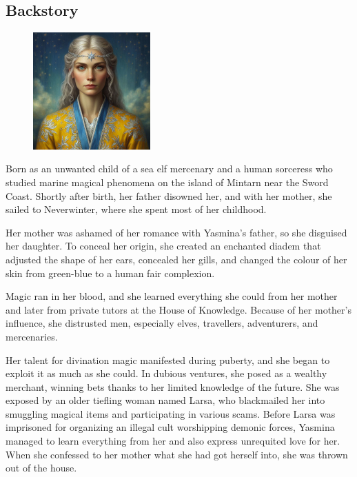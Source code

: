 \documentclass[10pt,onecolumn,twoside,openany,bg=full,layout=true]{dndbook}
\begin{document}
\subsection{Backstory}\label{subsec:yasmina-backstory}
\begin{figure}
  \begin{center}
    \includegraphics[width=0.4\textwidth]{img/yasmina}
  \end{center}
\end{figure}
Born as an unwanted child of a sea elf mercenary and a human sorceress who studied marine magical phenomena on the
island of Mintarn near the Sword Coast.
Shortly after birth, her father disowned her, and with her mother, she sailed
to Neverwinter, where she spent most of her childhood.

Her mother was ashamed of her romance with Yasmina's father, so she disguised her daughter.
To conceal her origin, she created an enchanted diadem that adjusted the shape of her ears, concealed her gills,
and changed the colour of her skin from green-blue to a human fair complexion.

Magic ran in her blood, and she learned everything she could from her mother and later from private tutors at the
House of Knowledge.
Because of her mother's influence, she distrusted men, especially elves, travellers, adventurers, and mercenaries.

Her talent for divination magic manifested during puberty, and she began to exploit it as much as she could.
In dubious ventures, she posed as a wealthy merchant, winning bets thanks to her limited knowledge of the future.
She was exposed by an older tiefling woman named Larsa, who blackmailed her into smuggling magical items and
participating in various scams.
Before Larsa was imprisoned for organizing an illegal cult worshipping demonic forces, Yasmina managed to learn
everything from her and also express unrequited love for her.
When she confessed to her mother what she had got herself into, she was thrown out of the house.
\end{document}
